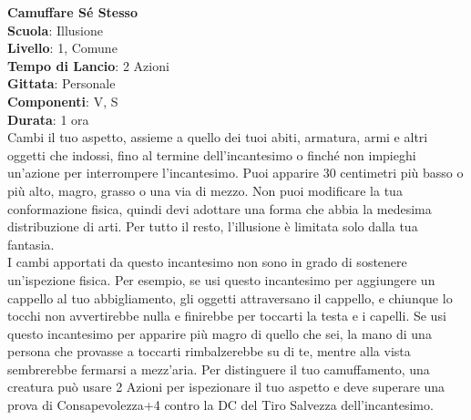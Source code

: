 \begin{multicols}{2}
\medskip\textbf{Camuffare Sé Stesso}\\
\textbf{Scuola}: Illusione\\
\textbf{Livello}: 1, Comune\\
\textbf{Tempo di Lancio}: 2 Azioni\\
\textbf{Gittata}: Personale\\
\textbf{Componenti}: V, S\\
\textbf{Durata}: 1 ora\\
Cambi il tuo aspetto, assieme a quello dei tuoi abiti, armatura, armi e altri oggetti che indossi, fino al termine dell'incantesimo o finché non impieghi un'azione per interrompere l'incantesimo. Puoi apparire 30 centimetri più basso o più alto, magro, grasso o una via di mezzo. Non puoi modificare la tua conformazione fisica, quindi devi adottare una forma che abbia la medesima distribuzione di arti. Per tutto il resto, l'illusione è limitata solo dalla tua fantasia.\\
I cambi apportati da questo incantesimo non sono in grado di sostenere un'ispezione fisica. Per esempio, se usi questo incantesimo per aggiungere un cappello al tuo abbigliamento, gli oggetti attraversano il cappello, e chiunque lo tocchi non avvertirebbe nulla e finirebbe per toccarti la testa e i capelli. Se usi questo incantesimo per apparire più magro di quello che sei, la mano di una persona che provasse a toccarti rimbalzerebbe su di te, mentre alla vista sembrerebbe fermarsi a mezz'aria. Per distinguere il tuo camuffamento, una creatura può usare 2 Azioni per ispezionare il tuo aspetto e deve superare una prova di Consapevolezza+4 contro la DC del Tiro Salvezza dell'incantesimo.


\end{multicols}
